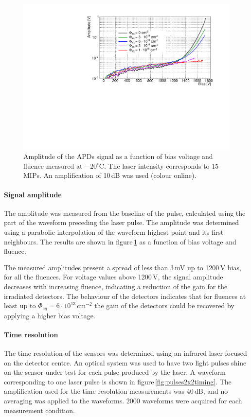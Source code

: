 \documentclass[review,number,sort&compress]{elsarticle}
\begin{document}
\begin{figure}
  \centering
  \includegraphics[width = 0.6 \columnwidth]{ampliIrrad_5mV}
  \caption{Amplitude of the APDs signal as a function of bias voltage and fluence measured at $-20^\circ$C. The laser intensity corresponds to 15\,MIPs. An amplification of 10\,dB was used (colour online).}
  \label{fig:ampli2x2_15MIP}
\end{figure}

\paragraph{Signal amplitude}
The amplitude was measured from the baseline of the pulse, calculated using the part of the waveform preceding the laser pulse.
The amplitude was determined using a parabolic interpolation of the waveform highest point and its first neighbours.
The results are shown in figure\,\ref{fig:ampli2x2_15MIP} as a function of bias voltage and fluence.

The measured amplitudes present a spread of less than 3\,mV up to 1200\,V bias, for all the fluences.
For voltage values above 1200\,V, the signal amplitude decreases with increasing fluence, indicating a reduction of the gain for the irradiated detectors.
The behaviour of the detectors indicates that for fluences at least up to $\Phi_{eq} = 6 \cdot 10^{13}$\,cm$^{-2}$ the gain of the detectors could be recovered by applying a higher bias voltage.

\paragraph{Time resolution}
The time resolution of the sensors was determined using an infrared laser focused on the detector centre.
An optical system was used to have two light pulses shine on the sensor under test for each pulse produced by the laser.
A waveform corresponding to one laser pulse is shown in figure\,\ref{fig:pulses2x2timing}.
The amplification used for the time resolution measurements was 40\,dB, and no averaging was applied to the waveforms.
2000 waveforms were acquired for each measurement condition.
\end{document}
